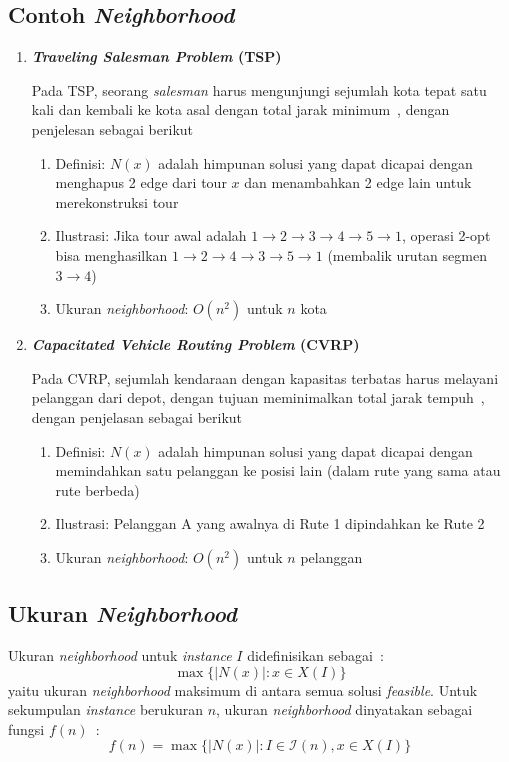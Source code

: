 \documentclass{file/TA-ITS}
\theoremstyle{definition}
\theoremstyle{definition}
\theoremstyle{plain}
\begin{document}
\subsection{Contoh \textit{Neighborhood}}

\begin{enumerate}
\item \textbf{\textit{Traveling Salesman Problem} (TSP)}

Pada TSP, seorang \textit{salesman} harus mengunjungi sejumlah kota tepat satu kali dan kembali ke kota asal dengan total jarak minimum~\cite{pisinger2018lns}, dengan penjelesan sebagai berikut
\begin{enumerate}
    \item Definisi: $N(x)$ adalah himpunan solusi yang dapat dicapai dengan menghapus 2 edge dari tour $x$ dan menambahkan 2 edge lain untuk merekonstruksi tour
    \item Ilustrasi: Jika tour awal adalah $1 \to 2 \to 3 \to 4 \to 5 \to 1$, operasi 2-opt bisa menghasilkan $1 \to 2 \to 4 \to 3 \to 5 \to 1$ (membalik urutan segmen $3 \to 4$)
    \item Ukuran \textit{neighborhood}: $O(n^2)$ untuk $n$ kota
\end{enumerate}

\item \textbf{\textit{Capacitated Vehicle Routing Problem} (CVRP)}

Pada CVRP, sejumlah kendaraan dengan kapasitas terbatas harus melayani pelanggan dari depot, dengan tujuan meminimalkan total jarak tempuh~\cite{pisinger2018lns}, dengan penjelasan sebagai berikut
\begin{enumerate}
    \item Definisi: $N(x)$ adalah himpunan solusi yang dapat dicapai dengan memindahkan satu pelanggan ke posisi lain (dalam rute yang sama atau rute berbeda)
    \item Ilustrasi: Pelanggan A yang awalnya di Rute 1 dipindahkan ke Rute 2
    \item Ukuran \textit{neighborhood}: $O(n^2)$ untuk $n$ pelanggan
\end{enumerate}
\end{enumerate}

\subsection{Ukuran \textit{Neighborhood}}

Ukuran \textit{neighborhood} untuk \textit{instance} $I$ didefinisikan sebagai~\cite{pisinger2018lns}:
\begin{equation}
\max\{|N(x)| : x \in X(I)\}
\end{equation}
yaitu ukuran \textit{neighborhood} maksimum di antara semua solusi \textit{feasible}. Untuk sekumpulan \textit{instance} berukuran $n$, ukuran \textit{neighborhood} dinyatakan sebagai fungsi $f(n)$~\cite{pisinger2018lns}:
\begin{equation}
f(n) = \max\{|N(x)| : I \in \mathcal{I}(n), x \in X(I)\}
\end{equation}
\end{document}
